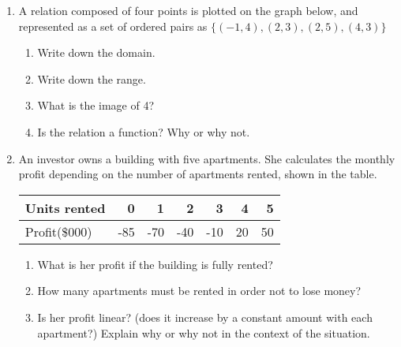 \documentclass[12pt, twoside]{article}
\begin{document}
\begin{enumerate}
\newpage

\item A relation composed of four points is plotted on the graph below, and represented as a set of ordered pairs as $\{ (-1,4),(2,3),(2,5),(4,3) \}$
\begin{multicols}{2}
\begin{enumerate}
  \item Write down the domain.
  \item Write down the range.
  \item What is the image of 4?
  \item Is the relation a function? Why or why not. \vspace{2cm}
\end{enumerate}
  \begin{center} %
  \end{center}
\end{multicols}
\vspace{0.25cm}

\item An investor owns a building with five apartments. She calculates the monthly profit depending on the number of apartments rented, shown in the table. 
\begin{center}
  \begin{tabular}{|l|r|r|r|r|r|r|}
    \hline
    Units rented & 0 & 1 & 2 & 3 & 4 & 5\\ 
    \hline 
    Profit(\$000) & -85 & -70 & -40 & -10 & 20 & 50\\ 
    \hline 
  \end{tabular}
\end{center}
\begin{enumerate}
  \item What is her profit if the building is fully rented?\vspace{0.25cm}
  \item How many apartments must be rented in order not to lose money?\vspace{0.25cm}
  \item Is her profit linear? (does it increase by a constant amount with each apartment?) Explain why or why not in the context of the situation.
\end{enumerate} \vspace{2cm}



\end{enumerate}
\end{document}
